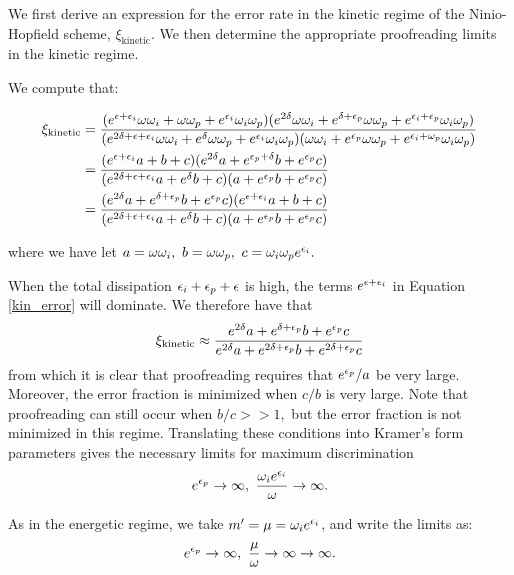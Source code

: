 We first derive an expression for the error rate in the kinetic regime of the Ninio-Hopfield scheme, $\xi_{\text{kinetic}}$.  We then determine the appropriate proofreading limits in the kinetic regime.  

We compute that:
\begin{widetext}
\begin{equation}\label{kin_error}
\begin{aligned}
\xi_{\text{kinetic}} &= \frac{(e^{\epsilon+\epsilon_i}\omega\omega_i+\omega{\omega_p}+e^{\epsilon_i}\omega_i{\omega_p}) (e^{2\delta}\omega\omega_i+e^{\delta+{\epsilon_p}}\omega{\omega_p}+e^{\epsilon_i+{\epsilon_p}}\omega_i{\omega_p}) }{(e^{2\delta+\epsilon+\epsilon_i}\omega\omega_i+e^\delta\omega{\omega_p}+e^{\epsilon_i}\omega_i{\omega_p})(\omega\omega_i+e^{{\epsilon_p}}\omega{\omega_p}+e^{\epsilon_i+{\omega_p}}\omega_i{\omega_p})}\\
&=\frac{(e^{\epsilon+\epsilon_i}a + b + c)(e^{2\delta}a + e^{{\epsilon_p}+\delta}b + e^{{\epsilon_p}}c)}{(e^{2\delta+\epsilon + \epsilon_i}a + e^{\delta}b + c)(a + e^{{\epsilon_p}}b + e^{{\epsilon_p}}c)}\\
& = \frac{(e^{2\delta}a + e^{\delta+{\epsilon_p}}b + e^{{\epsilon_p}}c)(e^{\epsilon+\epsilon_i}a + b + c)}{(e^{2\delta+\epsilon+\epsilon_i}a + e^\delta b + c)(a + e^{\epsilon_p} b + e^{\epsilon_p} c)}
\end{aligned}
\end{equation}
\end{widetext}
where we have let $a = \omega\omega_i, \ b = \omega{\omega_p}, \ c = \omega_i{\omega_p}{e^{\epsilon_i}}.$

When the total dissipation $\epsilon_i + {\epsilon_p} + \epsilon$ is high, the terms $e^{\epsilon+\epsilon_i}$ in Equation \ref{kin_error} will dominate.  We therefore have that
\[
\xi_{\text{kinetic}} \approx \frac{e^{2\delta}a+e^{\delta+{\epsilon_p}}b + e^{\epsilon_p} c}{e^{2\delta}a + e^{2\delta+{\epsilon_p}}b + e^{2\delta+{\epsilon_p}}c}
\]
from which it is clear that proofreading requires that ${e^{\epsilon_p}}/a$ be very large.  Moreover, the error fraction is minimized when $c/b$ is very large.  Note that proofreading can still occur when $b/c>>1,$ but the error fraction is not minimized in this regime.  Translating these conditions into Kramer's form parameters gives the necessary limits for maximum discrimination
\[
{e^{\epsilon_p}} \to \infty, \ \frac{\omega_i{e^{\epsilon_i}}}{\omega} \to \infty.
\]

As in the energetic regime, we take $m'=\mu = \omega_i{e^{\epsilon_i}}$, and write the limits as:
\[
{e^{\epsilon_p}} \to \infty, \ \frac{\mu}{\omega}\to\infty \to \infty.
\]

